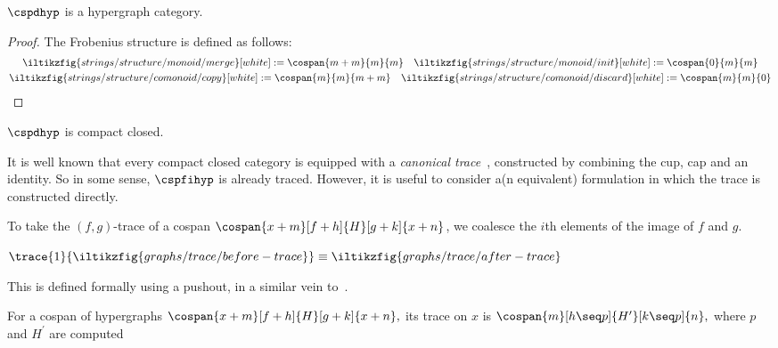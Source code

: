 \begin{proposition}\label{prop:hypergraph-category}
    \(\cspdhyp\) is a hypergraph category.
\end{proposition}
\begin{proof}
    The Frobenius structure is defined as follows:
    \begin{gather*}
        \iltikzfig{strings/structure/monoid/merge}[white]
        :=
        \cospan{m + m}{m}{m}
        \quad
        \iltikzfig{strings/structure/monoid/init}[white]
        :=
        \cospan{0}{m}{m}
        \\
        \iltikzfig{strings/structure/comonoid/copy}[white]
        :=
        \cospan{m}{m}{m+m}
        \quad
        \iltikzfig{strings/structure/comonoid/discard}[white]
        :=
        \cospan{m}{m}{0}
    \end{gather*}
    \iftoggle{conf}{}{
        It is a simple exercise to check the axioms are satisfied.
    }
\end{proof}

\begin{corollary}
    \(\cspdhyp\) is compact closed.
\end{corollary}

It is well known that every compact closed category is equipped with a
\emph{canonical trace}~\cite{joyal1996traced}, constructed by combining the cup,
cap and an identity.
So in some sense, \(\cspfihyp\) is already traced.
However, it is useful to consider a(n equivalent) formulation in which the trace
is constructed directly.

To take the \((f,g)\)-trace of a cospan \(\cospan{x+m}[f+h]{H}[g+k]{x+n}\), we
coalesce the \(i\)th elements of the image of \(f\) and \(g\).
\begin{center}
    \(
        \trace{1}{\iltikzfig{graphs/trace/before-trace}}
        \equiv
        \iltikzfig{graphs/trace/after-trace}
    \)
\end{center}

This is defined formally using a pushout, in a similar vein
to~\cite{dixon2013opengraphs}.

\begin{definition}
    For a cospan of hypergraphs \(
        \cospan{x+m}[f+h]{H}[g+k]{x+n},
    \) its trace on \(x\) is \(
        \cospan{m}[h \seq p]{H^\prime}[k \seq p]{n},
    \) where \(p\) and \(H^\prime\) are computed%
    \iftoggle{conf}{
        as the pushout of \(f + h\) and \([\id, \id]\).
    }{
        by the following pushout:
        \begin{center}
            \tikzfig{graphs/trace/trace-pushout}
        \end{center}
    }
\end{definition}

